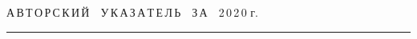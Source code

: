 




\def\stat{cont}


{%




\raggedleft\Large \bf%


А\,В\,Т\,О\,Р\,С\,К\,И\,Й\ \ У\,К\,А\,З\,А\,Т\,Е\,Л\,Ь\ \ З\,А\ \ 2\,0\,2\,0 г. \vskip 17pt


 \hrule


 \par


 }







\label{st\stat}

















\def\leftkol{\ } %


\def\rightkol{\ } %






















\def\leftfootline{\small{\textbf{\thepage}


\hfill СИСТЕМЫ И СРЕДСТВА ИНФОРМАТИКИ\ \ \ выпуск~30\ \ \ №~4\ \ \ 2020}


}%


 \def\rightfootline{\small{СИСТЕМЫ И СРЕДСТВА ИНФОРМАТИКИ\ \ \ выпуск~30\ \ \


№~4\ \ \ 2020


 \hfill \textbf{\thepage}}}





